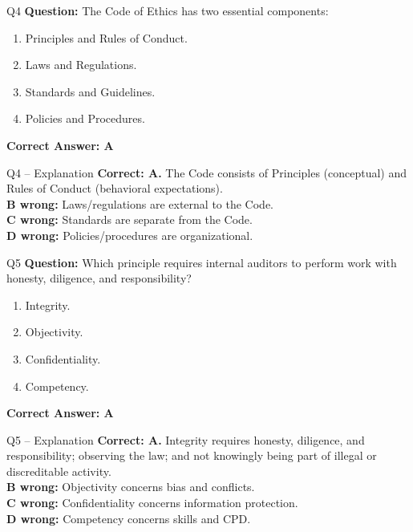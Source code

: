 \documentclass[aspectratio=169,10pt]{beamer}
\begin{document}
	\begin{frame}[t]{Q4}
		\small
		\textbf{Question:} The Code of Ethics has two essential components:
		\begin{enumerate}[label=\Alph*.,itemsep=1pt,topsep=2pt]
			\item Principles and Rules of Conduct.
			\item Laws and Regulations.
			\item Standards and Guidelines.
			\item Policies and Procedures.
		\end{enumerate}
		\vspace{4pt}
		\textbf{Correct Answer: A}
	\end{frame}
	
	\begin{frame}[t]{Q4 -- Explanation}
		\small
		\textbf{Correct: A.} The Code consists of Principles (conceptual) and Rules of Conduct (behavioral expectations). \\[4pt]
		\textbf{B wrong:} Laws/regulations are external to the Code. \\[2pt]
		\textbf{C wrong:} Standards are separate from the Code. \\[2pt]
		\textbf{D wrong:} Policies/procedures are organizational.
	\end{frame}
	
	\begin{frame}[t]{Q5}
		\small
		\textbf{Question:} Which principle requires internal auditors to perform work with honesty, diligence, and responsibility?
		\begin{enumerate}[label=\Alph*.,itemsep=1pt,topsep=2pt]
			\item Integrity.
			\item Objectivity.
			\item Confidentiality.
			\item Competency.
		\end{enumerate}
		\vspace{4pt}
		\textbf{Correct Answer: A}
	\end{frame}
	
	\begin{frame}[t]{Q5 -- Explanation}
		\small
		\textbf{Correct: A.} Integrity requires honesty, diligence, and responsibility; observing the law; and not knowingly being part of illegal or discreditable activity. \\[4pt]
		\textbf{B wrong:} Objectivity concerns bias and conflicts. \\[2pt]
		\textbf{C wrong:} Confidentiality concerns information protection. \\[2pt]
		\textbf{D wrong:} Competency concerns skills and CPD.
	\end{frame}
	
\end{document}
